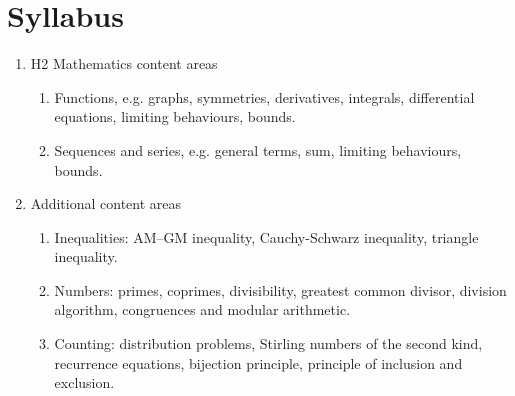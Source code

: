 \documentclass[12pt,a4 paper]{article}
\begin{document}
\section*{Syllabus}
\begin{enumerate}
\item H2 Mathematics content areas
	\begin{enumerate}
	\item Functions, e.g. graphs, symmetries, derivatives, integrals, differential equations, limiting behaviours, bounds.
	\item Sequences and series, e.g. general terms, sum, limiting behaviours, bounds.
	\end{enumerate}

\item Additional content areas
	\begin{enumerate}
	\item Inequalities: AM--GM inequality, Cauchy-Schwarz inequality, triangle inequality.
	\item Numbers: primes, coprimes, divisibility, greatest common divisor, division algorithm, congruences and modular arithmetic.
	\item Counting: distribution problems, Stirling numbers of the second kind, recurrence equations, bijection principle, principle of inclusion and exclusion.
	\end{enumerate}
\end{enumerate}
\pagebreak
\end{document}
